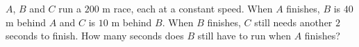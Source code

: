 $A$, $B$ and $C$ run a $200$ m race, each at a constant speed. When $A$ finishes, $B$ is $40$ m behind $A$ and $C$ is $10$ m behind $B$. When $B$ finishes, $C$ still needs another $2$ seconds to finish. How many seconds does $B$ still have to run when $A$ finishes?
